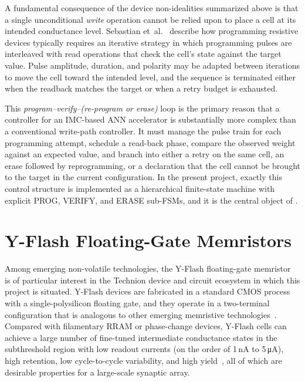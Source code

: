A fundamental consequence of the device non-idealities summarized above is
that a single unconditional \emph{write} operation cannot be relied upon
to place a cell at its intended conductance level. Sebastian
et~al.~\cite{Sebastian2020IMC} describe how programming resistive devices
typically requires an iterative strategy in which programming pulses are
interleaved with read operations that check the cell's state against the
target value. Pulse amplitude, duration, and polarity may be adapted
between iterations to move the cell toward the intended level, and the
sequence is terminated either when the readback matches the target or when
a retry budget is exhausted.

This \emph{program--verify--(re-program or erase)} loop is the primary
reason that a controller for an IMC-based ANN accelerator is substantially
more complex than a conventional write-path controller. It must manage
the pulse train for each programming attempt, schedule a read-back phase,
compare the observed weight against an expected value, and branch into
either a retry on the same cell, an erase followed by reprogramming, or
a declaration that the cell cannot be brought to the target in the
current configuration. In the present project, exactly this control
structure is implemented as a hierarchical finite-state machine with
explicit PROG, VERIFY, and ERASE sub-FSMs, and it is the central object
of .

\section{Y-Flash Floating-Gate Memristors}
\label{sec:bg-yflash}

Among emerging non-volatile technologies, the Y-Flash floating-gate
memristor~\cite{Wang2022YFlash} is of particular interest in the
Technion device and circuit ecosystem in which this project is situated.
Y-Flash devices are fabricated in a standard CMOS process with a
single-polysilicon floating gate, and they operate in a two-terminal
configuration that is analogous to other emerging memristive
technologies~\cite{Wang2022YFlash}. Compared with filamentary RRAM or
phase-change devices, Y-Flash cells can achieve a large number of
fine-tuned intermediate conductance states in the subthreshold region
with low readout currents (on the order of 1\,nA to 5\,\si{\micro\ampere}),
high retention, low cycle-to-cycle variability, and high
yield~\cite{Wang2022YFlash}, all of which are desirable properties for a
large-scale synaptic array.

